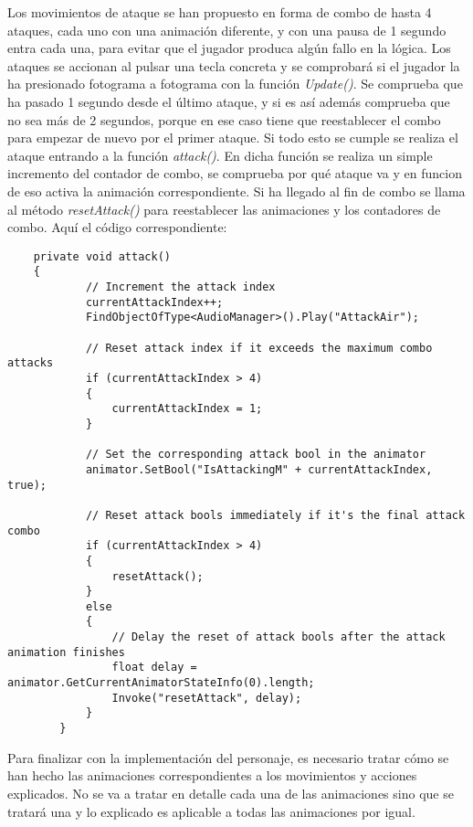 Los movimientos de ataque se han propuesto en forma de combo de hasta 4 ataques, cada uno con una animación diferente, y con una pausa de 1 segundo entra cada una, para evitar que el jugador produca algún fallo en la lógica. Los ataques se accionan al pulsar una tecla concreta y se comprobará si el jugador la ha presionado fotograma a fotograma con la función \textit{Update()}. Se comprueba que ha pasado 1 segundo desde el último ataque, y si es así además comprueba que no sea más de 2 segundos, porque en ese caso tiene que reestablecer el combo para empezar de nuevo por el primer ataque. Si todo esto se cumple se realiza el ataque entrando a la función \textit{attack()}. En dicha función se realiza un simple incremento del contador de combo, se comprueba por qué ataque va y en funcion de eso activa la animación correspondiente. Si ha llegado al fin de combo se llama al método \textit{resetAttack()} para reestablecer las animaciones y los contadores de combo. Aquí el código correspondiente:

\begin{lstlisting}
    private void attack()
    {
            // Increment the attack index
            currentAttackIndex++;
            FindObjectOfType<AudioManager>().Play("AttackAir");
    
            // Reset attack index if it exceeds the maximum combo attacks
            if (currentAttackIndex > 4)
            {
                currentAttackIndex = 1;
            }
    
            // Set the corresponding attack bool in the animator
            animator.SetBool("IsAttackingM" + currentAttackIndex, true);
    
            // Reset attack bools immediately if it's the final attack combo
            if (currentAttackIndex > 4)
            {
                resetAttack();
            }
            else
            {
                // Delay the reset of attack bools after the attack animation finishes
                float delay = animator.GetCurrentAnimatorStateInfo(0).length;
                Invoke("resetAttack", delay);
            }
        }
\end{lstlisting}

Para finalizar con la implementación del personaje, es necesario tratar cómo se han hecho las animaciones correspondientes a los movimientos y acciones explicados. No se va a tratar en detalle cada una de las animaciones sino que se tratará una y lo explicado es aplicable a todas las animaciones por igual.

